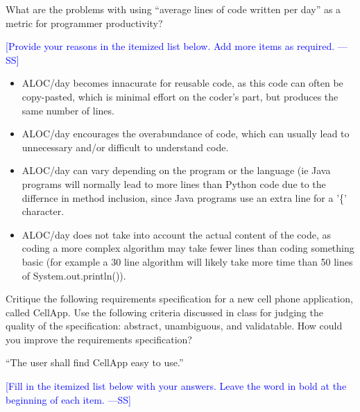 \documentclass[12pt,fleqn]{examtst}
\newcommand{\authornote}[3]{\textcolor{#1}{[#3 ---#2]}}
\newcommand{\authornote}[3]{}
\newcommand{\wss}[1]{\authornote{blue}{SS}{#1}}
\begin{document}

\renewcommand{\labelenumi}{\Alph{enumi}.}

\newpage


 What are the problems with using ``average lines of code
written per day'' as a metric for programmer productivity?

\bigskip

\noindent \wss{Provide your reasons in the itemized list below.  Add more items
  as required.}

\begin{itemize}
\item ALOC/day becomes innacurate for reusable code, as this code can often be copy-pasted, which is minimal effort on the coder's part, but produces the same number of lines.
\item ALOC/day encourages the overabundance of code, which can usually lead to unnecessary and/or difficult to understand code.
\item ALOC/day can vary depending on the program or the language (ie Java programs will normally lead to more lines than Python code due to the differnce in method inclusion, since Java programs use an extra line for a '\{' character.
\item ALOC/day does not take into account the actual content of the code, as coding a more complex algorithm may take fewer lines than coding something basic (for example a 30 line algorithm will likely take more time than 50 lines of System.out.println()).
\end{itemize}


\newpage

 Critique the following requirements specification
for a new cell phone application, called CellApp.  Use the following criteria
discussed in class for judging the quality of the specification: abstract,
unambiguous, and validatable.  How could you improve the requirements
specification?

\bigskip

``The user shall find CellApp easy to use.''

\bigskip

\noindent \wss{Fill in the itemized list below with your answers.  Leave the
  word in bold at the beginning of each item.}
\end{document}
